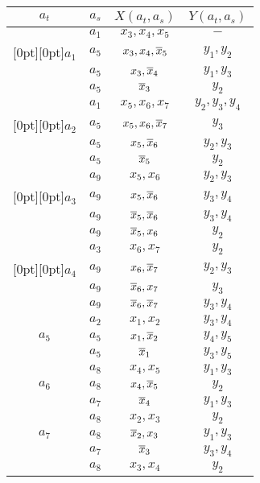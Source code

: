 \begin{table*}
\begin{center}
\begin{minipage}[t]{190pt}
\tabcolsep=12pt
\begin{tabular}{|c|c|c|c|}
\hline
 $a_t$ & $a_s$ & $X(a_t,a_s)$ & $Y(a_t,a_s)$ \\
\hline
 & $a_1$ & $x_3,x_4,x_5$ & $-$\\
\multicolumn{1}{|c|}{\raisebox{-6pt}[0pt][0pt]{$a_1$}} & $a_5$ & $x_3,x_4,\overline x_5$ & $y_1,y_2$\\
 & $a_5$ & $x_3,\overline x_4$ & $y_1,y_3$\\
 & $a_5$ & $\overline x_3$ & $y_2$\\
\hline
 & $a_1$ & $x_5,x_6,x_7$ & $y_2,y_3,y_4$\\
\multicolumn{1}{|c|}{\raisebox{-6pt}[0pt][0pt]{$a_2$}} & $a_5$ & $x_5,x_6,\overline x_7$ & $y_3$ \\
 & $a_5$ & $x_5,\overline x_6$ & $y_2,y_3$\\
 & $a_5$ & $\overline x_5$ & $y_2$\\
\hline
 & $a_9$ & $x_5,x_6$ & $y_2,y_3$\\
\multicolumn{1}{|c|}{\raisebox{-6pt}[0pt][0pt]{$a_3$}} & $a_9$ & $x_5,\overline x_6$ & $y_3,y_4$\\
 & $a_9$ & $\overline x_5,\overline x_6$ & $y_3,y_4$\\
 & $a_9$ & $\overline x_5,x_6$ & $y_2$\\
\hline
 & $a_3$ & $x_6,x_7$ & $y_2$\\
\multicolumn{1}{|c|}{\raisebox{-6pt}[0pt][0pt]{$a_4$}} & $a_9$ & $x_6,\overline x_7$ & $y_2,y_3$\\
 & $a_9$ & $\overline x_6,x_7$ & $y_3$\\
 & $a_9$ & $\overline x_6,\overline x_7$ & $y_3,y_4$\\
\hline
  & $a_2$ & $x_1,x_2$ & $y_3,y_4$ \\
 $a_5$& $a_5$ & $x_1,\overline x_2$ & $y_4,y_5$ \\
 & $a_5$ & $\overline x_1$ & $y_3,y_5$ \\
\hline
  & $a_8$ & $x_4,x_5$ & $y_1,y_3$ \\
 $a_6$& $a_8$ & $x_4,\overline x_5$ & $y_2$ \\
 & $a_7$ & $\overline x_4$ & $y_1,y_3$ \\
\hline
  & $a_8$ & $x_2,x_3$ & $y_2$ \\
$a_7$ & $a_8$ & $\overline x_2,x_3$ & $y_1,y_3$ \\
 & $a_7$ & $\overline x_3$ & $y_3,y_4$ \\
\hline
  & $a_8$ & $x_3,x_4$ & $y_2$ \\

\end{tabular}
\end{minipage}
\end{center}
\end{table*}
